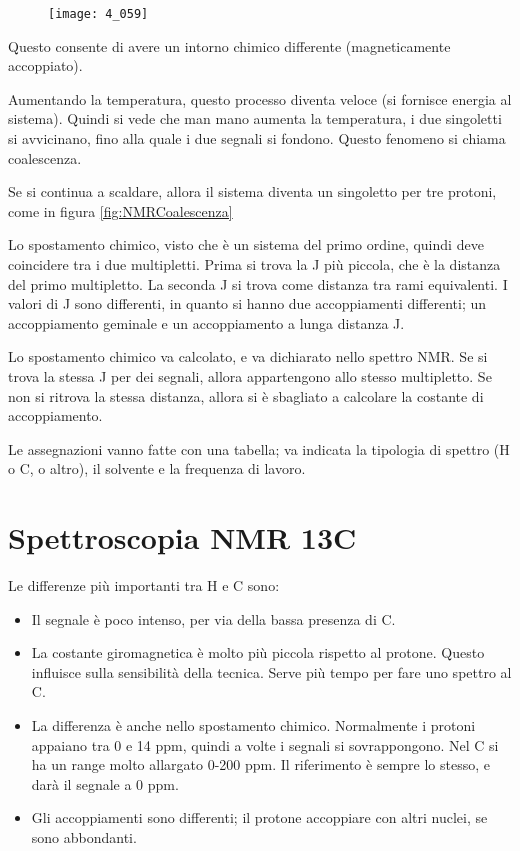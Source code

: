 \begin{figure}[H]
  \texttt{[image: 4\_059]}
\end{figure}

Questo consente di avere un intorno chimico differente (magneticamente
accoppiato).

Aumentando la temperatura, questo processo diventa veloce (si fornisce
energia al sistema). Quindi si vede che man mano aumenta la temperatura,
i due singoletti si avvicinano, fino alla quale i due segnali si
fondono. Questo fenomeno si chiama coalescenza.

Se si continua a scaldare, allora il sistema diventa un singoletto per
tre protoni, come in figura \ref{fig:NMRCoalescenza}


Lo spostamento chimico, visto che è un sistema del primo ordine, quindi deve
coincidere tra i due multipletti.
Prima si trova la J più piccola, che è la distanza del primo
multipletto.
La seconda J si trova come distanza tra rami equivalenti. I valori di J
sono differenti, in quanto si hanno due accoppiamenti differenti; un accoppiamento geminale e un accoppiamento a lunga distanza J.

Lo spostamento chimico va calcolato, e va dichiarato nello spettro NMR.
Se si trova la stessa J per dei segnali, allora appartengono allo stesso
multipletto.
Se non si ritrova la stessa distanza, allora si è sbagliato a calcolare
la costante di accoppiamento.

Le assegnazioni vanno fatte con una tabella; va indicata la tipologia di
spettro (H o C, o altro), il solvente e la frequenza di lavoro.

\section{Spettroscopia NMR 13C}

Le differenze più importanti tra H e C sono:
\begin{itemize}
  \item Il segnale è poco intenso, per via della bassa presenza di C.
  \item La costante giromagnetica è molto più piccola rispetto al protone.
  Questo influisce sulla sensibilità della tecnica. Serve più tempo per
  fare uno spettro al C.
  \item La differenza è anche nello spostamento chimico. Normalmente i protoni
  appaiano tra 0 e 14 ppm, quindi a volte i segnali si sovrappongono. Nel   C si ha un range molto allargato 0-200 ppm. Il riferimento è sempre lo
  stesso, e darà il segnale a 0 ppm.
  \item Gli accoppiamenti sono differenti; il protone accoppiare con altri nuclei, se sono
  abbondanti.
\end{itemize}

